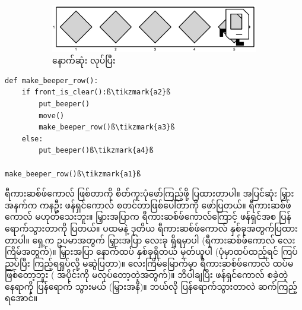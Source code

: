 \begin{figure}[thb!]
    \begin{subfigure}[t]{{\figpctw}\textwidth}
        \includegraphics[scale=0.15]{images/ch04/mrofb/after.jpg}
        \caption{နောက်ဆုံး  လုပ်ပြီး}    
        \label{fig:mrofb_recur6}
    \end{subfigure}
    \caption{}
    \label{fig:mrofb_recur}
\end{figure}


%
\setlength{\fboxsep}{0pt}
\begin{verbatim}
def make_beeper_row():
    if front_is_clear():ß\tikzmark{a2}ß
        put_beeper()
        move()
        make_beeper_row()ß\tikzmark{a3}ß
    else:
        put_beeper()ß\tikzmark{a4}ß

make_beeper_row()ß\tikzmark{a1}ß
\end{verbatim}
%
%
\btwntikzannoandpar

ရီကားဆစ်ဖ်ကောလ် ဖြစ်တာကို စိတ်ကူးပုံဖော်ကြည့်ဖို့ ပြထားတာပါ။ အပြင်ဆုံး မြှားအနက်က ကန\allowbreak ဦး ဖန်ရှင်ကောလ် စတင်တာဖြစ်ပေါ်တာကို ဖော်ပြတယ်။ ရီကားဆစ်ဖ်ကောလ် မဟုတ်သေးဘူး။ မြှားအပြာက ရီကားဆစ်ဖ်ကောလ်ကြောင့် ဖန်ရှင်အစ ပြန်ရောက်သွားတာကို ပြတယ်။ ပထမနဲ့ ဒုတိယ ရီကားဆစ်ဖ်ကောလ် နှစ်ခုအတွက်ပြထားတာပါ။ ရှေ့က ဥပမာအတွက် မြှားအပြာ လေးခု ရှိရမှာပါ (ရီကားဆစ်ဖ်ကောလ် လေးကြိမ်အတွက်)။  မြှားအပြာ နောက်ထပ် နှစ်ခုရှိတယ် မှတ်ယူပါ (ပုံမှာထပ်ထည့်ရင် ကြပ်ညပ်ပြီး ကြည့်ရရှုပ်လို့ မဆွဲပြတာ)။ လေးကြိမ်မြောက်မှာ ရီကားဆစ်ဖ်ကောလ် ထပ်မဖြစ်တော့ဘူး ( အပိုင်းကို မလုပ်တော့တဲ့အတွက်)။ ဘိပါချပြီး ဖန်ရှင်ကောလ် စခဲ့တဲ့နေရာကို ပြန်ရောက် သွားမယ် (မြှားအနီ)။ ဘယ်လို ပြန်ရောက်သွားတာလဲ ဆက်ကြည့်ရအောင်။

